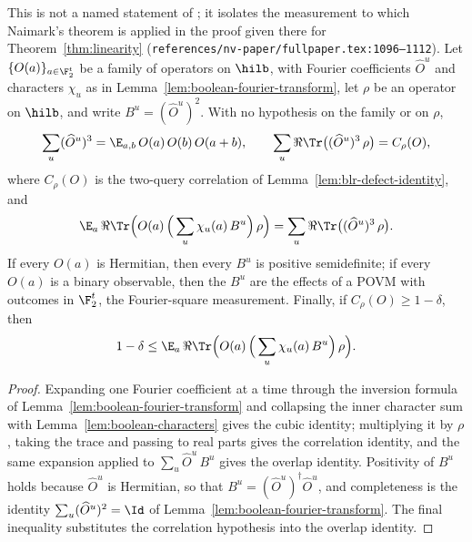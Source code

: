 \begin{lemma}
	\label{lem:fourier-square-measurement}
	\leanok
	This is not a named statement of \cite{Natarajan2017Linearity}; it isolates
	the measurement to which Naimark's theorem is applied in the proof given
	there for Theorem~\ref{thm:linearity}
	(\texttt{references/nv-paper/fullpaper.tex:1096--1112}). Let
	$\{O(a)\}_{a \in \F_2^t}$ be a family of operators on $\hilb$, with Fourier
	coefficients $\widehat{O}^u$ and characters $\chi_u$ as in
	Lemma~\ref{lem:boolean-fourier-transform}, let $\rho$ be an operator on
	$\hilb$, and write $B^u = (\widehat{O}^u)^2$. With no hypothesis on the
	family or on $\rho$,
	\[
		\sum_u (\widehat{O}^u)^3 = \E_{a,b} \, O(a) \, O(b) \, O(a+b) ,
		\qquad
		\sum_u \Re \Tr\big((\widehat{O}^u)^3 \, \rho\big) = C_\rho(O) ,
	\]
	where $C_\rho(O)$ is the two-query correlation of
	Lemma~\ref{lem:blr-defect-identity}, and
	\[
		\E_a \, \Re \Tr\Big(O(a) \,
		\Big(\sum_u \chi_u(a) \, B^u\Big) \, \rho\Big)
		= \sum_u \Re \Tr\big((\widehat{O}^u)^3 \, \rho\big) .
	\]
	If every $O(a)$ is Hermitian, then every $B^u$ is positive semidefinite;
	if every $O(a)$ is a binary observable, then the $B^u$ are the effects of a
	POVM with outcomes in $\F_2^t$, the Fourier-square measurement. Finally,
	if $C_\rho(O) \ge 1 - \delta$, then
	\[
		1 - \delta \le \E_a \, \Re \Tr\Big(O(a) \,
		\Big(\sum_u \chi_u(a) \, B^u\Big) \, \rho\Big) .
	\]
\end{lemma}
\begin{proof}
	\leanok
	Expanding one Fourier coefficient at a time through the inversion formula
	of Lemma~\ref{lem:boolean-fourier-transform} and collapsing the inner
	character sum with Lemma~\ref{lem:boolean-characters} gives the cubic
	identity; multiplying it by $\rho$, taking the trace and passing to real
	parts gives the correlation identity, and the same expansion applied to
	$\sum_u \widehat{O}^u \, B^u$ gives the overlap identity. Positivity of
	$B^u$ holds because $\widehat{O}^u$ is Hermitian, so that
	$B^u = (\widehat{O}^u)^\dagger \widehat{O}^u$, and completeness is the
	identity $\sum_u (\widehat{O}^u)^2 = \Id$ of
	Lemma~\ref{lem:boolean-fourier-transform}. The final inequality
	substitutes the correlation hypothesis into the overlap identity.
\end{proof}

